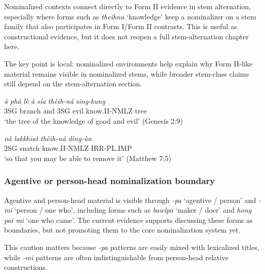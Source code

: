 \documentclass[
  11pt,
  a4paper,
]{article}
\newcommand{\tdim}[1]{\textit{#1}}
\newcommand{\tdimword}[1]{\textit{#1}}
\renewcommand{\textsc}[1]{{\footnotesize\MakeUppercase{#1}}}
\newcommand{\glossquote}[1]{`#1'}
\begin{document}
Nominalized contexts connect directly to Form II evidence in stem
alternation, especially where forms such as \tdim{theihna}
\glossquote{knowledge} keep a nominalizer on a stem family that also
participates in Form I/Form II contrasts. This is useful as
constructional evidence, but it does not reopen a full stem-alternation
chapter here.

The key point is local: nominalized environments help explain why Form
II-like material remains visible in nominalized stems, while broader
stem-class claims still depend on the stem-alternation section.

\begin{exe}
\ex \label{ex:nmlz-stem-theihna-gen2}
\gll \tdimword{à} \tdimword{phà} \tdimword{lè} \tdimword{à} \tdimword{sía} \tdimword{thèih-ná} \tdimword{sing-kung} \\
     \textsc{3sg} branch and \textsc{3sg} evil know.\textsc{ii}-\textsc{nmlz} tree \\
\glt \glossquote{the tree of the knowledge of good and evil} (Genesis 2:9)
\end{exe}

\begin{exe}
\ex \label{ex:nmlz-stem-theihna-matt7}
\gll \tdimword{nà} \tdimword{lakkhiat} \tdimword{thèih-ná} \tdimword{dìng-ùn} \\
     \textsc{2sg} snatch know.\textsc{ii}-\textsc{nmlz} \textsc{irr}-\textsc{pl}.\textsc{imp} \\
\glt \glossquote{so that you may be able to remove it} (Matthew 7:5)
\end{exe}

\subsubsection{Agentive or person-head nominalization
boundary}\label{agentive-or-person-head-nominalization-boundary}

Agentive and person-head material is visible through \tdim{-pa}
\glossquote{agentive / person} and \tdim{-mi}
\glossquote{person / one who}, including forms such as \tdim{bawlpa}
\glossquote{maker / doer} and \tdim{hong pai mi}
\glossquote{one who came}. The current evidence supports discussing
these forms as boundaries, but not promoting them to the core
nominalization system yet.

This caution matters because \tdim{-pa} patterns are easily mixed with
lexicalized titles, while \tdim{-mi} patterns are often
indistinguishable from person-head relative constructions.
\end{document}
